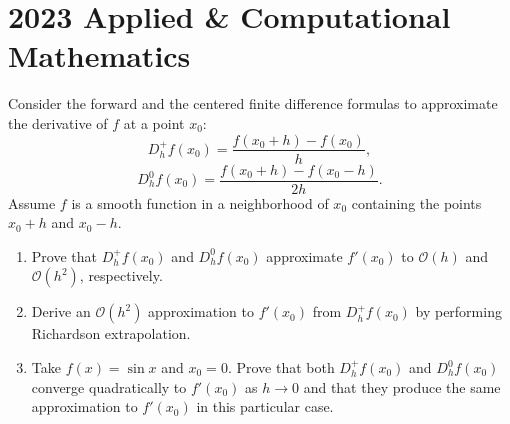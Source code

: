 \section{2023 Applied \& Computational Mathematics}

\begin{exercise}
\label{applied:2023:1}
Consider the forward and the centered finite difference formulas to approximate the derivative of $f$ at a point $x_0$:
\begin{equation}
    D_h^+ f(x_0) = \frac{f(x_0 + h) - f(x_0)}{h}, \tag{1}
\end{equation}
\begin{equation}
    D_h^0 f(x_0) = \frac{f(x_0 + h) - f(x_0 - h)}{2h}. \tag{2}
\end{equation}
Assume $f$ is a smooth function in a neighborhood of $x_0$ containing the points $x_0 + h$ and $x_0 - h$.

\begin{enumerate}[label=(\alph*)]
    \item Prove that $D_h^+ f(x_0)$ and $D_h^0 f(x_0)$ approximate $f'(x_0)$ to $\mathcal{O}(h)$ and $\mathcal{O}(h^2)$, respectively.
    \item Derive an $\mathcal{O}(h^2)$ approximation to $f'(x_0)$ from $D_h^+ f(x_0)$ by performing Richardson extrapolation.
    \item Take $f(x) = \sin x$ and $x_0 = 0$. Prove that both $D_h^+ f(x_0)$ and $D_h^0 f(x_0)$ converge quadratically to $f'(x_0)$ as $h \to 0$ and that they produce the same approximation to $f'(x_0)$ in this particular case.
\end{enumerate}
\end{exercise}

